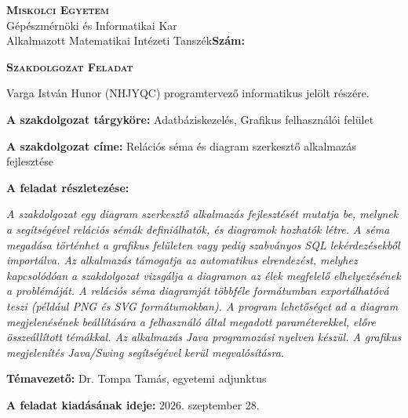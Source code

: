 \noindent
\textsc{\textbf{Miskolci Egyetem}}\\
Gépészmérnöki és Informatikai Kar\\
Alkalmazott Matematikai Intézeti Tanszék\hspace*{4cm}\hfil \textbf{Szám:}

\vspace{0.5cm}
\begin{center}
\large\textsc{\textbf{Szakdolgozat Feladat}}
\end{center}
\vspace{0.5cm}

Varga István Hunor (NHJYQC) programtervező informatikus jelölt részére.

\bigskip
\noindent\textbf{A szakdolgozat tárgyköre:} Adatbáziskezelés, Grafikus felhasználói felület

\bigskip
\noindent\textbf{A szakdolgozat címe:} Relációs séma és diagram szerkesztő alkalmazás fejlesztése

\bigskip
\noindent\textbf{A feladat részletezése:}

\medskip

\emph{A szakdolgozat egy diagram szerkesztő alkalmazás fejlesztését mutatja be, melynek a segítségével relációs sémák definiálhatók, és diagramok hozhatók létre. A séma megadása történhet a grafikus felületen vagy pedig szabványos SQL lekérdezésekből importálva. Az alkalmazás támogatja az automatikus elrendezést, melyhez kapcsolódóan a szakdolgozat vizsgálja a diagramon az élek megfelelő elhelyezésének a problémáját. A relációs séma diagramját többféle formátumban exportálhatóvá teszi (például PNG és SVG formátumokban). A program lehetőséget ad a diagram megjelenésének beállítására a felhasználó által megadott paraméterekkel, előre összeállított témákkal. Az alkalmazás Java programozási nyelven készül. A grafikus megjelenítés Java/Swing segítségével kerül megvalósításra.}

\medskip


\vfill

\noindent\textbf{Témavezető:} Dr. Tompa Tamás, egyetemi adjunktus


\bigskip
\noindent\textbf{A feladat kiadásának ideje:} 2026. szeptember 28.


